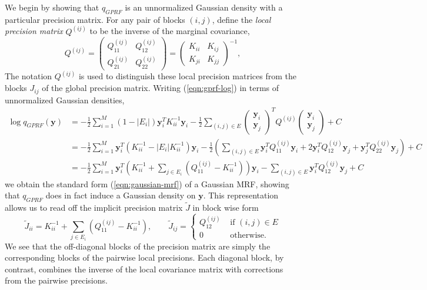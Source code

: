 \documentclass{article}
\renewcommand{\v}[1]{\mathbf{#1}}
\begin{document}
We begin by showing that $q_{GPRF}$ is an unnormalized Gaussian
density with a particular precision matrix. For any pair of blocks $(i,j)$, define the {\em local precision  matrix} $Q^{(ij)}$ to be the inverse of the marginal covariance,
\[Q^{(ij)} = \left(\begin{array}{cc} Q^{(ij)}_{11} &  Q^{(ij)}_{12}\\
  Q^{(ij)}_{21}  & Q^{(ij)}_{22}\end{array}\right) = \left(\begin{array}{cc} K_{ii} &  K_{ij}\\
  K_{ji}  & K_{jj}\end{array}\right)^{-1},\]
The notation $Q^{(ij)}$ is used to distinguish these local precision
matrices from the blocks $J_{ij}$ of the global precision matrix. Writing (\ref{eqn:gprf-log}) in terms of unnormalized Gaussian densities,
\begin{align*}
\log q_{GPRF}(\v{y}) &= -\frac{1}{2} \sum_{i=1}^M (1-|E_i|) \v{y}_i^T
K_{ii}^{-1} \v{y}_i -\frac{1}{2}  \sum_{(i,j)\in E} \left(\begin{array}{c}
      \v{y}_i \\ \v{y}_j\end{array}\right)^T Q^{(ij)}\left(\begin{array}{c}
      \v{y}_i \\
      \v{y}_j\end{array}\right) + C\\
&= -\frac{1}{2}\sum_{i=1}^M  \v{y}_i^T \left(K_{ii}^{-1} - |E_i|
  K_{ii}^{-1}\right)\v{y}_i -\frac{1}{2}  \left(\sum_{(i,j)\in E} \v{y}_i^T
Q^{(ij)}_{11} \v{y}_i + 2\v{y}_i^T Q^{(ij)}_{12}\v{y}_j + \v{y}_j^T Q^{(ij)}_{22}\v{y}_j\right) + C\\
&= -\frac{1}{2}\sum_{i=1}^M  \v{y}_i^T \left(K_{ii}^{-1} + \sum_{j\in E_i}
\left(Q^{(ij)}_{11} - K_{ii}^{-1}\right) \right)\v{y}_i - \sum_{(i,j)\in E}
\v{y}_i^T Q^{(ij)}_{12} \v{y}_j + C
\end{align*}
we obtain the standard form (\ref{eqn:gaussian-mrf}) of a Gaussian
MRF, showing that $q_{GPRF}$ does in fact induce a Gaussian density on
$\v{y}$. This
representation allows us to read off the implicit precision matrix $\tilde{J}$ in block wise form
\begin{equation}
\tilde{J}_{ii} = K_{ii}^{-1} + \sum_{j\in E_i} \left(Q^{(ij)}_{11}
    - K_{ii}^{-1}\right), \qquad \tilde{J}_{ij} =
  \left\{\begin{array}{ll}Q^{(ij)}_{12} & \text{ if } (i,j) \in E\\0
    & \text{ otherwise.}\end{array}\right.\label{eqn:approx-precision}
\end{equation}
We see that the off-diagonal blocks of the precision matrix are simply
the corresponding blocks of the pairwise local precisions. Each
diagonal block, by contrast, combines the inverse of the local
covariance matrix with corrections from the pairwise
precisions. 
\end{document}
